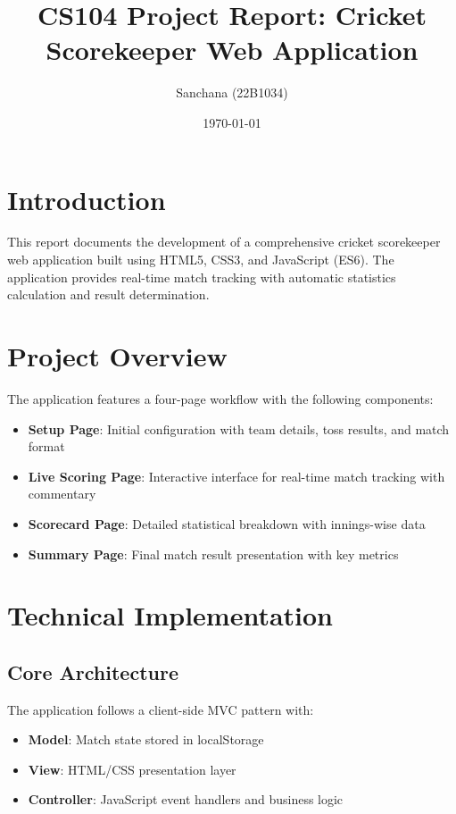 \documentclass[12pt]{article}
\title{CS104 Project Report: Cricket Scorekeeper Web Application}
\author{Sanchana (22B1034)}
\date{\today}
\begin{document}
\maketitle

\section*{Introduction}
This report documents the development of a comprehensive cricket scorekeeper web application built using HTML5, CSS3, and JavaScript (ES6). The application provides real-time match tracking with automatic statistics calculation and result determination. 

\section*{Project Overview}
The application features a four-page workflow with the following components:

\begin{itemize}[leftmargin=*]
    \item \textbf{Setup Page}: Initial configuration with team details, toss results, and match format
    \item \textbf{Live Scoring Page}: Interactive interface for real-time match tracking with commentary
    \item \textbf{Scorecard Page}: Detailed statistical breakdown with innings-wise data
    \item \textbf{Summary Page}: Final match result presentation with key metrics
\end{itemize}

\section*{Technical Implementation}

\subsection*{Core Architecture}
The application follows a client-side MVC pattern with:
\begin{itemize}
    \item \textbf{Model}: Match state stored in localStorage
    \item \textbf{View}: HTML/CSS presentation layer
    \item \textbf{Controller}: JavaScript event handlers and business logic
\end{itemize}
\end{document}
